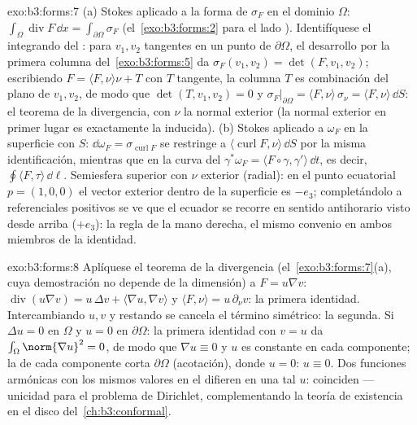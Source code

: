 \begin{solution}{exo:b3:forms:7}
(a) Stokes aplicado a la forma de  $\sigma_F$ en el dominio
 $\Omega$:
$\int_\Omega\operatorname{div}F\,\dd x =
\int_{\partial\Omega}\sigma_F$ (el~\cref{exo:b3:forms:2} para el lado
). Identifíquese el
integrando del : para $v_1, v_2$
tangentes en un punto de $\partial\Omega$, el desarrollo por la primera
columna del~\cref{exo:b3:forms:5} da
$\sigma_F(v_1, v_2) = \det(F, v_1, v_2)$; escribiendo $F =
\langle F, \nu\rangle\nu + T$ con $T$ tangente, la columna $T$ es
combinación del plano de $v_1, v_2$, de modo que $\det(T,
v_1, v_2) = 0$ y $\sigma_F\vert_{\partial\Omega} = \langle F,
\nu\rangle\,\sigma_\nu = \langle F, \nu\rangle\,\dd S$: el teorema de la
divergencia, con $\nu$ la normal exterior (la normal exterior en primer
lugar es exactamente la 
inducida). (b) Stokes aplicado a $\omega_F$ en la superficie con 
$S$: $\dd\omega_F =
\sigma_{\operatorname{curl}F}$ se restringe a
$\langle\operatorname{curl}F, \nu\rangle\,\dd S$ por la misma
identificación, mientras que en la curva del
$\gamma^*\omega_F = \langle F\circ\gamma,
\gamma'\rangle\,\dd t$, es decir, $\oint\langle F,
\tau\rangle\,\dd\ell$. Semiesfera superior con $\nu$ exterior (radial):
en el punto ecuatorial $p = (1,0,0)$ el vector exterior dentro de la
superficie es $-e_3$; completándolo a referenciales positivos se ve que
el ecuador se recorre en sentido antihorario visto desde arriba
($+e_3$): la regla de la mano derecha, el mismo convenio en ambos
miembros de la identidad.
\end{solution}

\begin{solution}{exo:b3:forms:8}
Aplíquese el teorema de la divergencia (el~\cref{exo:b3:forms:7}(a),
cuya demostración no depende de la dimensión) a $F = u\nabla v$:
$\operatorname{div}(u\nabla v) = u\,\Delta v + \langle\nabla
u, \nabla v\rangle$ y $\langle F, \nu\rangle =
u\,\partial_\nu v$: la primera identidad. Intercambiando $u, v$ y
restando se cancela el término simétrico: la segunda. Si $\Delta u = 0$
en $\Omega$ y $u = 0$ en $\partial\Omega$: la primera identidad con
$v = u$ da $\int_\Omega\norm{\nabla u}^2 = 0$, de modo que
$\nabla u \equiv 0$ y $u$ es constante en cada componente; la
 de cada componente corta
$\partial\Omega$ (acotación), donde $u = 0$: $u \equiv 0$. Dos
funciones armónicas con los
mismos valores en el  difieren en
una tal $u$: coinciden --- unicidad para el problema de Dirichlet,
complementando la teoría de existencia en el disco
del~\cref{ch:b3:conformal}.
\end{solution}

